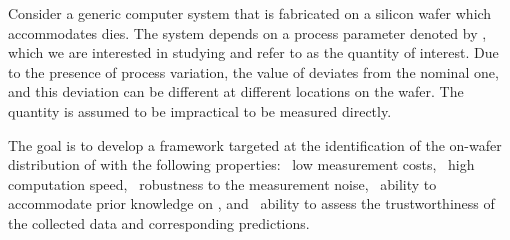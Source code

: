 Consider a generic computer system that is fabricated on a silicon wafer which
accommodates \nd dies. The system depends on a process parameter denoted by \g,
which we are interested in studying and refer to as the quantity of interest.
Due to the presence of process variation, the value of \g deviates from the
nominal one, and this deviation can be different at different locations on the
wafer. The quantity is assumed to be impractical to be measured directly.

The goal is to develop a framework targeted at the identification of the
on-wafer distribution of \g with the following properties: \one~low measurement
costs, \two~high computation speed, \three~robustness to the measurement noise,
\four~ability to accommodate prior knowledge on \g, and \five~ability to assess
the trustworthiness of the collected data and corresponding predictions.

